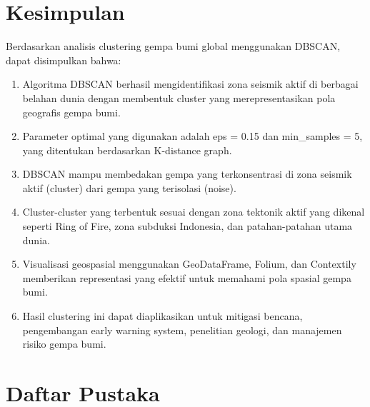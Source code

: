 \documentclass[12pt,a4paper]{article}
\begin{document}
\section{Kesimpulan}

Berdasarkan analisis clustering gempa bumi global menggunakan DBSCAN, dapat disimpulkan bahwa:

\begin{enumerate}
    \item Algoritma DBSCAN berhasil mengidentifikasi zona seismik aktif di berbagai belahan dunia dengan membentuk cluster yang merepresentasikan pola geografis gempa bumi.
    
    \item Parameter optimal yang digunakan adalah eps = 0.15 dan min\_samples = 5, yang ditentukan berdasarkan K-distance graph.
    
    \item DBSCAN mampu membedakan gempa yang terkonsentrasi di zona seismik aktif (cluster) dari gempa yang terisolasi (noise).
    
    \item Cluster-cluster yang terbentuk sesuai dengan zona tektonik aktif yang dikenal seperti Ring of Fire, zona subduksi Indonesia, dan patahan-patahan utama dunia.
    
    \item Visualisasi geospasial menggunakan GeoDataFrame, Folium, dan Contextily memberikan representasi yang efektif untuk memahami pola spasial gempa bumi.
    
    \item Hasil clustering ini dapat diaplikasikan untuk mitigasi bencana, pengembangan early warning system, penelitian geologi, dan manajemen risiko gempa bumi.
\end{enumerate}

\section{Daftar Pustaka}
\end{document}
